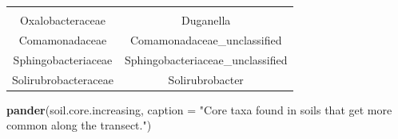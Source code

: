\documentclass[]{article}
\newenvironment{Shaded}{\begin{snugshade}}{\end{snugshade}}
\newcommand{\DataTypeTok}[1]{\textcolor[rgb]{0.13,0.29,0.53}{#1}}
\newcommand{\KeywordTok}[1]{\textcolor[rgb]{0.13,0.29,0.53}{\textbf{#1}}}
\newcommand{\NormalTok}[1]{#1}
\newcommand{\StringTok}[1]{\textcolor[rgb]{0.31,0.60,0.02}{#1}}
\begin{document}
\begin{longtable}[]{@{}cc@{}}
\begin{minipage}[t]{0.46\columnwidth}
\end{minipage}\tabularnewline
\begin{minipage}[t]{0.44\columnwidth}\centering
Oxalobacteraceae\strut
\end{minipage} & \begin{minipage}[t]{0.46\columnwidth}\centering
Duganella\strut
\end{minipage}\tabularnewline
\begin{minipage}[t]{0.44\columnwidth}\centering
Comamonadaceae\strut
\end{minipage} & \begin{minipage}[t]{0.46\columnwidth}\centering
Comamonadaceae\_unclassified\strut
\end{minipage}\tabularnewline
\begin{minipage}[t]{0.44\columnwidth}\centering
Sphingobacteriaceae\strut
\end{minipage} & \begin{minipage}[t]{0.46\columnwidth}\centering
Sphingobacteriaceae\_unclassified\strut
\end{minipage}\tabularnewline
\begin{minipage}[t]{0.44\columnwidth}\centering
Solirubrobacteraceae\strut
\end{minipage} & \begin{minipage}[t]{0.46\columnwidth}\centering
Solirubrobacter\strut
\end{minipage}\tabularnewline
\bottomrule
\end{longtable}

\begin{Shaded}
\begin{Highlighting}[]
\KeywordTok{pander}\NormalTok{(soil.core.increasing, }\DataTypeTok{caption =} \StringTok{"Core taxa found in soils that get more common along the transect."}\NormalTok{)}
\end{Highlighting}
\end{Shaded}
\end{document}
